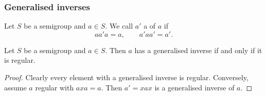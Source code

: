 \subsubsection{Generalised inverses}
\begin{definition}
Let $S$ be a semigroup and $a\in S$. We call $a'$ a  of $a$ if
\[ aa'a = a, \qquad a'aa' = a'. \]
\end{definition}

\begin{lemma}
Let $S$ be a semigroup and $a\in S$. Then $a$ has a generalised inverse \textup{if and only if} it is regular.
\end{lemma}
\begin{proof}
Clearly every element with a generalised inverse is regular. Conversely, assume $a$ regular with $axa = a$. Then $a' = xax$ is a generalised inverse of $a$.
\end{proof}

